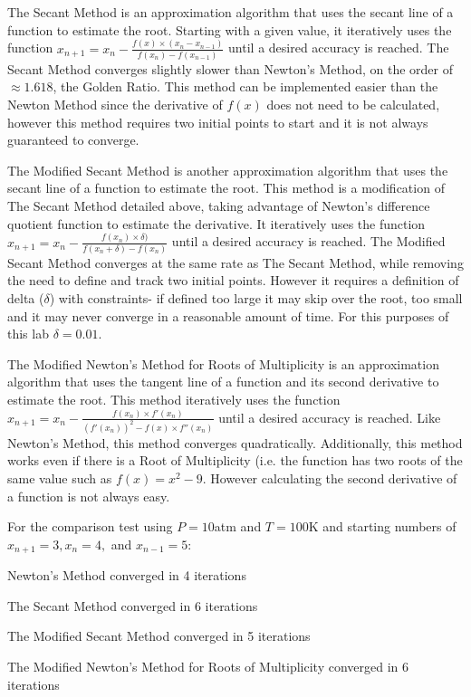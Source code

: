 \documentclass[12pt, letterpaper]{article}
\begin{document}
	The Secant Method is an approximation algorithm that uses the secant line of a function to estimate the root. Starting with a given value, it iteratively uses the function $x_{n+1}=x_n-\frac{f(x)\times(x_n-x_{n-1})}{f(x_n)-f(x_{n-1})}$ until a desired accuracy is reached. The Secant Method converges slightly slower than Newton's Method, on the order of ${\approx}1.618$, the Golden Ratio. This method can be implemented easier than the Newton Method since the derivative of $f(x)$ does not need to be calculated, however this method requires two initial points to start and it is not always guaranteed to converge.
	
	The Modified Secant Method is another approximation algorithm that uses the secant line of a function to estimate the root. This method is a modification of The Secant Method detailed above, taking advantage of Newton's difference quotient function to estimate the derivative. It iteratively uses the function $x_{n+1}=x_n-\frac{f(x_n)\times\delta)}{f(x_n+\delta)-f(x_n)}$ until a desired accuracy is reached. The Modified Secant Method converges at the same rate as The Secant Method, while removing the need to define and track two initial points. However it requires a definition of delta ($\delta$) with constraints- if defined too large it may skip over the root, too small and it may never converge in a reasonable amount of time. For this purposes of this lab $\delta=0.01$.
	
	The Modified Newton's Method for Roots of Multiplicity is an approximation algorithm that uses the tangent line of a function and its second derivative to estimate the root. This method iteratively uses the function $x_{n+1}=x_n-\frac{f(x_n)\times f'(x_n)}{(f'(x_n))^2-f(x)\times f''(x_n)}$ until a desired accuracy is reached. Like Newton's Method, this method converges quadratically. Additionally, this method works even if there is a Root of Multiplicity (i.e. the function has two roots of the same value such as $f(x)=x^2-9$. However calculating the second derivative of a function is not always easy.
	
	For the comparison test using $P=10$atm and $T=100$K and starting numbers of $x_{n+1}=3, x_n=4,$ and $x_{n-1}=5$:
	
	\begin{center}
		Newton's Method converged in 4 iterations
		
		The Secant Method converged in 6 iterations
		
		The Modified Secant Method converged in 5 iterations
		
		The Modified Newton's Method for Roots of Multiplicity converged in 6 iterations
	\end{center}
\end{document}
